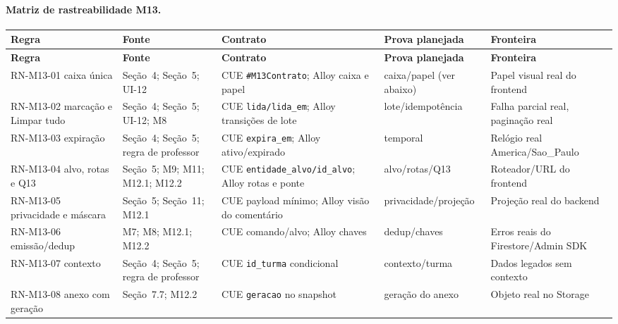 \paragraph{Matriz de rastreabilidade M13.}
\footnotesize
\setlength{\tabcolsep}{3pt}
\begin{longtable}{>{\raggedright\arraybackslash}p{} >{\raggedright\arraybackslash}p{} >{\raggedright\arraybackslash}p{} >{\raggedright\arraybackslash}p{} >{\raggedright\arraybackslash}p{}}
\toprule
\textbf{Regra} & \textbf{Fonte} & \textbf{Contrato} & \textbf{Prova planejada} & \textbf{Fronteira} \\
\midrule
\endfirsthead
\toprule
\textbf{Regra} & \textbf{Fonte} & \textbf{Contrato} & \textbf{Prova planejada} & \textbf{Fronteira} \\
\midrule
\endhead
\bottomrule
\endfoot
RN-M13-01 caixa única & Seção~4; Seção~5; UI-12 & CUE \texttt{\#M13Contrato}; Alloy caixa e papel & caixa/papel (ver abaixo) & Papel visual real do frontend \\
RN-M13-02 marcação e Limpar tudo & Seção~4; Seção~5; UI-12; M8 & CUE \texttt{lida/lida\_em}; Alloy transições de lote & lote/idempotência & Falha parcial real, paginação real \\
RN-M13-03 expiração & Seção~4; Seção~5; regra de professor & CUE \texttt{expira\_em}; Alloy ativo/expirado & temporal & Relógio real America/Sao\_Paulo \\
RN-M13-04 alvo, rotas e Q13 & Seção~5; M9; M11; M12.1; M12.2 & CUE \texttt{entidade\_alvo/id\_alvo}; Alloy rotas e ponte & alvo/rotas/Q13 & Roteador/URL do frontend \\
RN-M13-05 privacidade e máscara & Seção~5; Seção~11; M12.1 & CUE payload mínimo; Alloy visão do comentário & privacidade/projeção & Projeção real do backend \\
RN-M13-06 emissão/dedup & M7; M8; M12.1; M12.2 & CUE comando/alvo; Alloy chaves & dedup/chaves & Erros reais do Firestore/Admin SDK \\
RN-M13-07 contexto & Seção~4; Seção~5; regra de professor & CUE \texttt{id\_turma} condicional & contexto/turma & Dados legados sem contexto \\
RN-M13-08 anexo com geração & Seção~7.7; M12.2 & CUE \texttt{geracao} no snapshot & geração do anexo & Objeto real no Storage \\
\bottomrule
\end{longtable}
\normalsize

